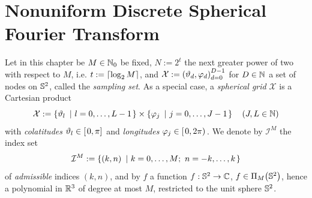 \chapter{Nonuniform Discrete Spherical Fourier Transform}
\label{DSFT}

Let in this chapter be $M \in \mathbb{N}_{0}$ be fixed, $N := 2^t$ the 
next greater power of two with respect to $M$, i.e. $t := {\left\lceil\log_2 M\right\rceil}$, and $\mathcal{X} := \left(\vartheta_d,\varphi_d\right)_{d=0}^{D-1}$ for $D \in \mathbb{N}$
a set of nodes on $\mathbb{S}^2$, called the \emph{sampling set}. As a special case, a \emph{spherical grid} 
$\mathcal{X}$ is a Cartesian product 
\[
  \mathcal{X} := \left\{\vartheta_{l}\ \left|\ l=0,\ldots,L-1\right.\right\rbrace \times \left\{\varphi_{j}\ \left|\ j=0,\ldots,J-1\right.\right\rbrace \quad \left(J,L \in \mathbb{N}\right)
\]
with \emph{colatitudes} $\vartheta_{l} \in \left[\left.0,\pi\right]\right.$ and \emph{longitudes} $\varphi_{j} \in \left[\left.0,2\pi\right)\right.$.
We denote by $\mathcal{I}^M$ the index set
\[
  \mathcal{I}^M := \left\{\left(k,n\right)\ \left|\ k=0,\ldots,M;\ n=-k,\ldots,k\right.\right\rbrace
\]
of \emph{admissible} indices $(k,n)$, and by $f$ a function $f: \mathbb{S}^2 \rightarrow \mathbb{C}$, $f \in \Pi_{M}{\hspace{-0.4ex}}\left(\mathbb{S}^2\right)$, hence a polynomial in $\mathbb{R}^3$ of degree at most $M$, restricted to the unit sphere $\mathbb{S}^2$.

